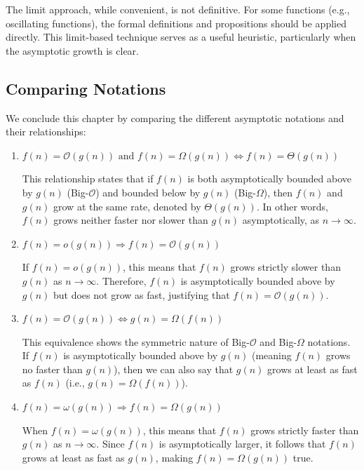        The limit approach, while convenient, is not definitive. For some functions (e.g., oscillating functions), the formal definitions and propositions should be applied directly. This limit-based technique serves as a useful heuristic, particularly when the asymptotic growth is clear.
    
\subsection*{Comparing Notations}
We conclude this chapter by comparing the different asymptotic notations and their relationships:

\begin{enumerate}
    \item \( f(n) = \mathcal{O}(g(n)) \text{ and } f(n) = \Omega(g(n)) \Leftrightarrow f(n) = \Theta(g(n)) \)
    
    This relationship states that if \( f(n) \) is both asymptotically bounded above by \( g(n) \) (Big-\(\mathcal{O}\)) and bounded below by \( g(n) \) (Big-\(\Omega\)), then \( f(n) \) and \( g(n) \) grow at the same rate, denoted by \( \Theta(g(n)) \). In other words, \( f(n) \) grows neither faster nor slower than \( g(n) \) asymptotically, as \( n \to \infty \). \medskip

    \item \( f(n) = o(g(n)) \Rightarrow f(n) = \mathcal{O}(g(n)) \)
    
    If \( f(n) = o(g(n)) \), this means that \( f(n) \) grows strictly slower than \( g(n) \) as \( n \to \infty \). Therefore, \( f(n) \) is asymptotically bounded above by \( g(n) \) but does not grow as fast, justifying that \( f(n) = \mathcal{O}(g(n)) \).\medskip

    \item \( f(n) = \mathcal{O}(g(n)) \Leftrightarrow g(n) = \Omega(f(n)) \)
    
    This equivalence shows the symmetric nature of Big-\(\mathcal{O}\) and Big-\(\Omega\) notations. If \( f(n) \) is asymptotically bounded above by \( g(n) \) (meaning \( f(n) \) grows no faster than \( g(n) \)), then we can also say that \( g(n) \) grows at least as fast as \( f(n) \) (i.e., \( g(n) = \Omega(f(n)) \)). \medskip

    \item \( f(n) = \omega(g(n)) \Rightarrow f(n) = \Omega(g(n)) \)
    
    When \( f(n) = \omega(g(n)) \), this means that \( f(n) \) grows strictly faster than \( g(n) \) as \( n \to \infty \). Since \( f(n) \) is asymptotically larger, it follows that \( f(n) \) grows at least as fast as \( g(n) \), making \( f(n) = \Omega(g(n)) \) true. \medskip


\end{enumerate}
